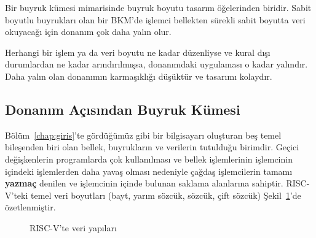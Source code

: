 Bir buyruk kümesi mimarisinde buyruk boyutu tasarım öğelerinden biridir. Sabit boyutlu buyrukları olan bir BKM'de işlemci bellekten sürekli sabit boyutta veri okuyacağı için donanım çok daha yalın olur.

\begin{tanim}
Herhangi bir işlem ya da veri boyutu ne kadar düzenliyse ve kural dışı durumlardan ne kadar arındırılmışsa, donanımdaki uygulaması o kadar yalındır. Daha yalın olan donanımın karmaşıklığı düşüktür ve tasarımı kolaydır.
\end{tanim}


\subsection{Donanım Açısından Buyruk Kümesi}

Bölüm~\ref{chap:giris}'te gördüğümüz gibi bir bilgisayarı oluşturan beş temel bileşenden biri olan bellek, buyrukların ve verilerin tutulduğu birimdir. Geçici değişkenlerin programlarda çok kullanılması ve bellek işlemlerinin işlemcinin içindeki işlemlerden daha yavaş olması nedeniyle çağdaş işlemcilerin tamamı \textbf{yazmaç} denilen ve işlemcinin içinde bulunan saklama alanlarına sahiptir. RISC-V'teki temel veri boyutları (bayt, yarım sözcük, sözcük, çift sözcük) Şekil~\ref{fig:riscv-veri-yapilari}'de özetlenmiştir.

\begin{figure}[H]
\centering
{}
\caption{RISC-V'te veri yapıları}
\label{fig:riscv-veri-yapilari}
\end{figure}

